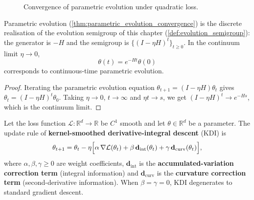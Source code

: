 \begin{figure}[htbp]
\centering
{}
\caption{Convergence of parametric evolution under quadratic loss.}
\label{fig:parametric_convergence}
\end{figure}

\begin{corollary}\label{cor:parametric_as_semigroup}
Parametric evolution (\cref{thm:parametric_evolution_convergence}) is the discrete realisation of the evolution semigroup of this chapter (\cref{def:evolution_semigroup}): the generator is $-H$ and the semigroup is $\{(I-\eta H)^t\}_{t\ge 0}$. In the continuum limit $\eta\to 0$,
\[
\theta(t) = e^{-Ht}\theta(0)
\]
corresponds to continuous-time parametric evolution.
\end{corollary}

\begin{proof}
Iterating the parametric evolution equation $\theta_{t+1} = (I-\eta H)\theta_t$ gives $\theta_t = (I-\eta H)^t\theta_0$. Taking $\eta\to 0$, $t\to\infty$ and $\eta t\to s$, we get $(I-\eta H)^t\to e^{-Hs}$, which is the continuum limit.
\end{proof}

\begin{definition}\label{def:kdi_definition}
Let the loss function $\mathcal{L}:\mathbb{R}^d\to\mathbb{R}$ be $C^1$ smooth and let $\theta\in\mathbb{R}^d$ be a parameter. The update rule of \textbf{kernel-smoothed derivative-integral descent} (KDI) is
\[
\theta_{t+1} = \theta_t - \eta\Bigl[\alpha\,\nabla\mathcal{L}(\theta_t) + \beta\,\mathbf{d}_{\text{int}}(\theta_t) + \gamma\,\mathbf{d}_{\text{curv}}(\theta_t)\Bigr],
\]
where $\alpha,\beta,\gamma\ge 0$ are weight coefficients, $\mathbf{d}_{\text{int}}$ is the \textbf{accumulated-variation correction term} (integral information) and $\mathbf{d}_{\text{curv}}$ is the \textbf{curvature correction term} (second-derivative information). When $\beta=\gamma=0$, KDI degenerates to standard gradient descent.
\end{definition}

